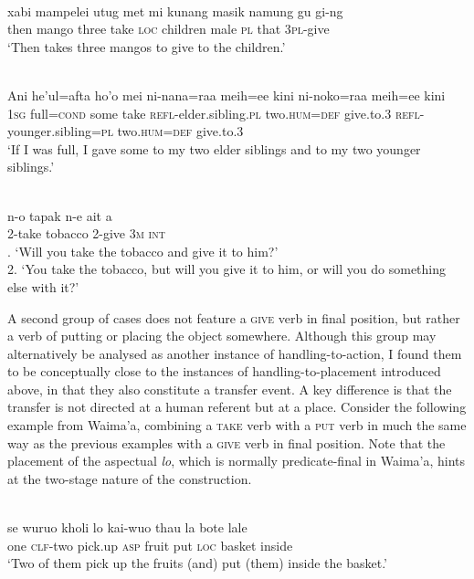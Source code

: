 \ea 
{}\\
\gll xabi mampelei utug met mi kunang masik namung gu gi-ng \\
then mango three take \textsc{loc} children male \textsc{pl} that 3\textsc{pl}-give \\
\glft `Then takes three mangos to give to the children.'\\ 
\z

\ea \label{Makalero_6}
\\
\gll Ani he’ul=afta ho’o mei ni-nana=raa meih=ee kini ni-noko=raa meih=ee kini \\
1\textsc{sg} full=\textsc{cond} some take \textsc{refl}-elder.sibling.\textsc{pl} two.\textsc{hum}=\textsc{def} give.to.3 \textsc{refl}-younger.sibling=\textsc{pl} two.\textsc{hum}=\textsc{def} give.to.3 \\
\glft ‘If I was full, I gave some to my two elder siblings and to my two younger
siblings.’ \\ 
\z

\ea \label{Maybrat_77}
\\
\gll n-o tapak n-e ait a \\
2-take tobacco 2-give 3\textsc{m} \textsc{int} \\
. `Will you take the tobacco and give it to him?' \\ 2. `You take the tobacco, but will you give it to him, or will you do something else with it?' \\ 
\z

A second group of cases does not feature a \textsc{give} verb in final position, but rather a verb of putting or placing the object somewhere. Although this group may alternatively be analysed as another instance of handling-to-action, I found them to be conceptually close to the instances of handling-to-placement introduced above, in that they also constitute a transfer event. A key difference is that the transfer is not directed at a human referent but at a place. Consider the following example from Waima'a, combining a \textsc{take} verb with a \textsc{put} verb in much the same way as the previous examples with a \textsc{give} verb in final position. Note that the placement of the aspectual \textit{lo}, which is normally predicate-final in Waima'a, hints at the two-stage nature of the construction.

\ea \label{WMHP058}
\\
\gll se wuruo kholi lo kai-wuo thau la bote lale \\
one \textsc{clf}-two pick.up \textsc{asp} fruit put \textsc{loc} basket inside \\
\glft `Two of them pick up the fruits (and) put (them) inside the basket.'\\ 
\z

